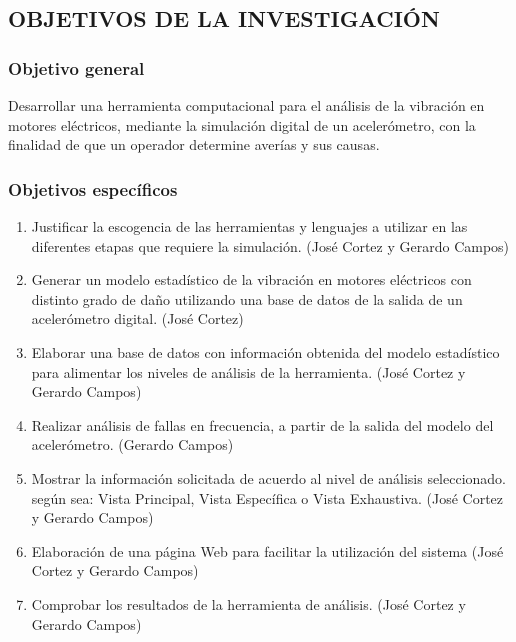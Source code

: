 \subsection{OBJETIVOS DE LA INVESTIGACIÓN}

\subsubsection{Objetivo general}
	Desarrollar una herramienta computacional para el análisis de la vibración en motores eléctricos, mediante la simulación digital de un acelerómetro, con la finalidad de que un operador determine averías y sus causas.


\subsubsection{Objetivos específicos}

	\begin{enumerate}
		\item Justificar la escogencia de las herramientas y lenguajes a utilizar en las diferentes etapas que requiere la simulación. (José Cortez y Gerardo Campos)

		\item Generar un modelo estadístico de la vibración en motores eléctricos con distinto grado de daño utilizando una base de datos de la salida de un acelerómetro digital. (José Cortez)

		\item Elaborar una base de datos con información obtenida del modelo estadístico para alimentar los niveles de análisis de la herramienta. (José Cortez y Gerardo Campos)

		\item Realizar análisis de fallas en frecuencia, a partir de la salida del modelo del acelerómetro. (Gerardo Campos)

		\item Mostrar la información solicitada de acuerdo al nivel de análisis seleccionado. según sea: Vista Principal, Vista Específica o Vista Exhaustiva. (José Cortez y Gerardo Campos)

		\item Elaboración de una página Web para facilitar la utilización del sistema (José Cortez y Gerardo Campos)

		\item Comprobar los resultados de la herramienta de análisis. (José Cortez y Gerardo Campos)
	\end{enumerate}

